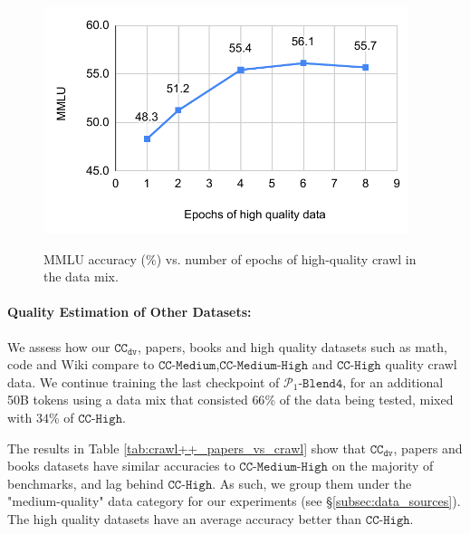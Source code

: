 \documentclass[11pt]{article}
\newcommand{\ccderiv}{$\mathtt{CC_{dv}}$\xspace}
\newcommand{\ccmq}{$\mathtt{CC}$-$\mathtt{Medium}$\xspace}
\newcommand{\ccmhq}{$\mathtt{CC}$-$\mathtt{Medium}$-$\mathtt{High}$\xspace}
\newcommand{\cchq}{$\mathtt{CC}$-$\mathtt{High}$\xspace}
\newcommand{\phaseone}{$\mathcal{P}_1$\xspace}
\begin{document}
\begin{figure}[t]
    \centering
    \includegraphics[width=0.95\textwidth]{figures/crawl_epoch.pdf}
    \\\vspace{-0.2\abovedisplayskip}
    \caption{MMLU accuracy (\%) vs. number of epochs of high-quality crawl in the data mix.}
    \label{fig:crawl_epoch}
\end{figure}


\paragraph{Quality Estimation of Other Datasets:}

We assess how our \ccderiv, papers, books and high quality datasets such as math, code and Wiki compare to \ccmq,\ccmhq and \cchq quality crawl data. 
We continue training the last checkpoint of \phaseone-$\mathtt{Blend4}$, for an additional 50B tokens using a data mix that consisted $66$\% of the data being tested, mixed with $34$\% of \cchq. 




The results in Table \ref{tab:crawl++_papers_vs_crawl} show that \ccderiv, papers and books datasets have similar accuracies to \ccmhq on the majority of benchmarks, and lag behind \cchq. 
As such, we group them under the "medium-quality" data category for our experiments (see \S\ref{subsec:data_sources}). 
The high quality datasets have an average accuracy better than \cchq.
\end{document}
